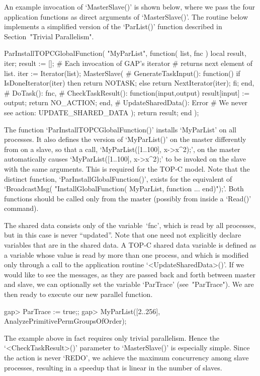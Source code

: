 An example invocation of `MasterSlave()' is shown below,  where  we  pass
the four application functions as direct  arguments  of  `MasterSlave()'.
The routine below implements a  simplified  version  of  the  `ParList()'
function described in Section~"Trivial Parallelism".

\begintt
ParInstallTOPCGlobalFunction( "MyParList",
function( list, fnc )
  local result, iter;
  result := [];
  # Each invocation of GAP's iterator
  # returns next element of list.
  iter := Iterator(list);
  MasterSlave(
      # GenerateTaskInput():
      function() if IsDoneIterator(iter) then return NOTASK;
                 else return NextIterator(iter); fi; end,
      # DoTask():
      fnc,
      # CheckTaskResult():
      function(input,output) result[input] := output; 
                             return NO_ACTION; end,
      # UpdateSharedData():
      Error # We never see action:  UPDATE_SHARED_DATA
      );
  return result;
end );
\endtt

The function `ParInstallTOPCGlobalFunction()' installs `MyParList' on all
{\ParGAP} processes. It also defines the version of `MyParList()' on  the
master differently from on a slave, so that a call,  `MyParList([1..100],
x->x^2);',  on  the  master  automatically  causes   `MyParList([1..100],
x->x^2);' to be invoked on the slave with the  same  arguments.  This  is
required  for  the  TOP-C  model.  Note  that  the   distinct   function,
`ParInstallGlobalFunction()', exists for the equivalent of `BroadcastMsg(
"InstallGlobalFunction( MyParList, function ... end)");'. Both  functions
should be called only from the master (possibly from  inside  a  `Read()'
command).

The shared data consists only of the variable~`fnc', which is read by all
processes, but in this case is never ``updated''. Note that one need  not
explicitly declare variables that are in the shared data. A TOP-C  shared
data variable is defined as a variable whose value is read by  more  than
one process, and which is modified only through a call to the application
routine `<UpdateSharedData>()'. If we would like to see the messages,  as
they are  passed  back  and  forth  between  master  and  slave,  we  can
optionally set the variable  `ParTrace'  (see~"ParTrace").  We  are  then
ready to execute our new parallel function.

\beginexample
gap>  ParTrace := true;;
gap>  MyParList([2..256], AnalyzePrimitivePermGroupsOfOrder);
\endexample

The example above in fact requires only trivial  parallelism.  Hence  the
`<CheckTaskResult>()' parameter to `MasterSlave()' is especially  simple.
Since the action is never `REDO',  we  achieve  the  maximum  concurrency
among slave processes, resulting in a  speedup  that  is  linear  in  the
number of slaves.

